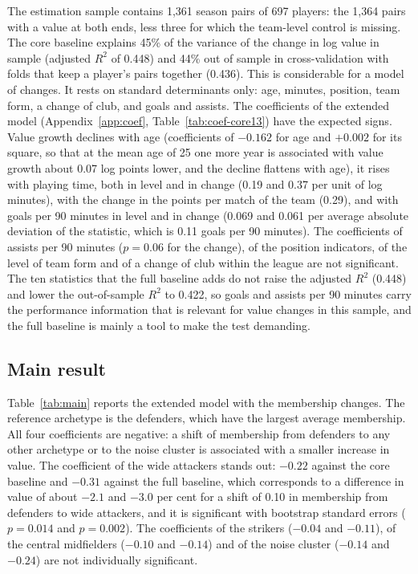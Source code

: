 The estimation sample contains 1,361 season pairs of 697 players: the 1,364 pairs with a value at both ends, less three for which the team-level control is missing. The core baseline explains 45\% of the variance of the change in log value in sample (adjusted $R^2$ of 0.448) and 44\% out of sample in cross-validation with folds that keep a player's pairs together (0.436). This is considerable for a model of changes. It rests on standard determinants only: age, minutes, position, team form, a change of club, and goals and assists. The coefficients of the extended model (Appendix~\ref{app:coef}, Table~\ref{tab:coef-core13}) have the expected signs. Value growth declines with age (coefficients of $-0.162$ for age and $+0.002$ for its square, so that at the mean age of 25 one more year is associated with value growth about 0.07 log points lower, and the decline flattens with age), it rises with playing time, both in level and in change (0.19 and 0.37 per unit of log minutes), with the change in the points per match of the team (0.29), and with goals per 90 minutes in level and in change (0.069 and 0.061 per average absolute deviation of the statistic, which is 0.11 goals per 90 minutes). The coefficients of assists per 90 minutes ($p=0.06$ for the change), of the position indicators, of the level of team form and of a change of club within the league are not significant. The ten statistics that the full baseline adds do not raise the adjusted $R^2$ (0.448) and lower the out-of-sample $R^2$ to 0.422, so goals and assists per 90 minutes carry the performance information that is relevant for value changes in this sample, and the full baseline is mainly a tool to make the test demanding.

\subsection{Main result}

Table~\ref{tab:main} reports the extended model with the membership changes. The reference archetype is the defenders, which have the largest average membership. All four coefficients are negative: a shift of membership from defenders to any other archetype or to the noise cluster is associated with a smaller increase in value. The coefficient of the wide attackers stands out: $-0.22$ against the core baseline and $-0.31$ against the full baseline, which corresponds to a difference in value of about $-2.1$ and $-3.0$ per cent for a shift of 0.10 in membership from defenders to wide attackers, and it is significant with bootstrap standard errors ($p=0.014$ and $p=0.002$). The coefficients of the strikers ($-0.04$ and $-0.11$), of the central midfielders ($-0.10$ and $-0.14$) and of the noise cluster ($-0.14$ and $-0.24$) are not individually significant.

